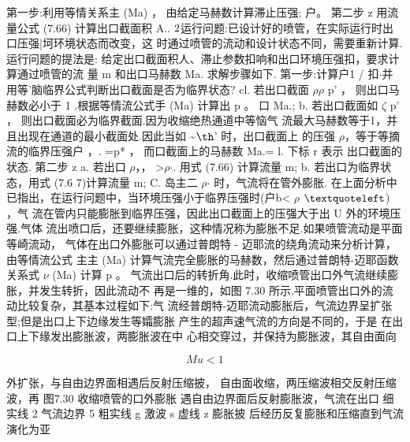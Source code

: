 第一步:利用等情关系主 (Ma) ， 由给定马赫数计算滞止压强; 户。 第二步 z 用流量公式 (7.66) 计算出口截面积 A.. ${\rm 2}$运行问题:已设计好的喷管，在实际运行时出口压强|坷环境状态而改变，这 时通过喷管的流动和设计状态不同，需要重新计算.运行问题的提法是: 给定出口截面积人、滞止参数扣响和出口环境压强扣，要求计算通过喷管的流 量 m 和出口马赫数 Ma. 求解步骤如下. 第一步:计算户1 / 扣$\cdot $并用等'脑临界公式判断出口截面是否为临界状态? cl. 若出口截面 $\rho$$\rho$ p' ， 则出口马赫数必小于 1 .根据等情流公式手 (Ma) 计算出 p 。 口 Ma.; b. 若出口截面如 $\zeta$ p' ， 则出口截面必为临界截面.因为收缩绝热通道中等恼气 流最大马赫数等于1，并且出现在通道的最小截面处.因此当如 \textasciitilde{}${\rm þ}$' 时，出口截面上 的压强 $\rho$，等于等摘流的临界压强户 ，. =p* ， 而口截面上的马赫数 Ma.= l. 下标 r 表示 出口截面的状态. 第二步 z a. 若出口 $\rho$，， >$\rho$$\cdot $. 用式 (7.66) 计算流量 m; b. 若出口为临界状态，用式 (7.6 7)计算流量 m; C. 岛主二 $\rho$$\cdot $ 时，气流将在管外膨胀. 在上面分析中已指出，在运行问题中，当环境压强小于临界压强时(户b< $\rho$ ${\rm ‘}$) ，气 流在管内只能膨胀到临界压强，因此出口截面上的压强大于出 U 外的环境压强.气体 流出喷口后，还要继续膨胀，这种情况称为膨胀不足.如果喷管流动是平面等崎流动， 气体在出口外膨胀可以通过普朗特 - 迈耶流的绕角流动来分析计算，由等情流公式 主主 (Ma) 计算气流完全膨胀的马赫数，然后通过普朗特-迈耶函数关系式 $\nu$ (Ma) 计算 p 。 气流出口后的转折角.此时，收缩喷管出口外气流继续膨胀，并发生转折，因此流动不 再是一维的，如图 7.30 所示.平面喷管出口外的流动比较复杂，其基本过程如下:气 流经普朗特-迈耶流动膨胀后，气流边界呈扩张型;但是出口上下边缘发生等孀膨胀 产生的超声速气流的方向是不同的，于是 在出口上下缘发出膨胀波，两膨胀波在中 心相交穿过，并保持为膨胀波，其自由面向

\[Mu<1\]

外扩张，与自由边界面相遇后反射压缩披， 自由面收缩，两压缩波相交反射压缩波，再 图7.30 收缩喷管的口外膨胀 遇自由边界面后反射膨胀波，气流在出口 细实线 2 气流边界 5 粗实线 g 激波 s 虚线 z 膨胀披 后经历反复膨胀和压缩直到气流演化为亚

